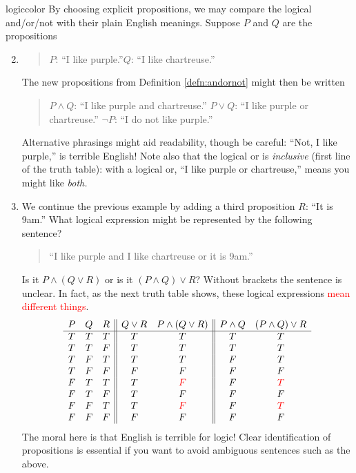 \begin{examples}{}{logiccolor}
	\exstart By choosing explicit propositions, we may compare the logical and/or/not with their plain English meanings. Suppose $P$ and $Q$ are the propositions
	\begin{enumerate}\setcounter{enumi}{1}
	  \item[]\begin{quote}
		$P$: ``I like purple.''\qquad\qquad $Q$: ``I like chartreuse.''
		\end{quote}
		The new propositions from Definition \ref{defn:andornot} might then be written
		\begin{quote}
			$P\wedge Q$: ``I like purple and chartreuse.''\qquad \qquad
			$P\vee Q$: ``I like purple or chartreuse.''\medbreak
			$\neg P$: ``I do not like purple.''
		\end{quote}
		Alternative phrasings might aid readability, though be careful: ``Not, I like purple,'' is terrible English! Note also that the logical or is \emph{inclusive} (first line of the truth table): with a logical or, ``I like purple or chartreuse,'' means you might like \emph{both.}
	
		\goodbreak
		
		\item We continue the previous example by adding a third proposition $R$: ``It is 9am.''
		What logical expression might be represented by the following sentence?
		\begin{quote}
			``I like purple and I like chartreuse or it is 9am.''
		\end{quote}
		Is it $P\wedge(Q\vee R)$ or is it $(P\wedge Q)\vee R$? Without brackets the sentence is unclear. In fact, as the next truth table shows, these logical expressions \textcolor{red}{mean different things}.
		\[
			\begin{array}{ccc||cc||cc}
				P & Q & R & Q\vee R & P\wedge (Q\vee R) & P\wedge Q & (P \wedge Q)\vee R\\\hline
				T & T & T & T & T & T & T\\
				T & T & F & T & T & T & T\\
				T & F & T & T & T & F & T\\
				T & F & F & F & F & F & F\\
				F & T & T & T & \textcolor{red}{F} & F & \textcolor{red}{T}\\
				F & T & F & T & F & F & F\\
				F & F & T & T & \textcolor{red}{F} & F & \textcolor{red}{T}\\
				F & F & F & F & F & F & F
			\end{array}
		\]
		The moral here is that English is terrible for logic! Clear identification of propositions is essential if you want to avoid ambiguous sentences such as the above.
		

\end{enumerate}
\end{examples}
